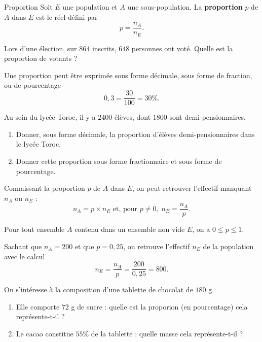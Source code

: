 \documentclass[11pt]{article}
\begin{document}
\begin{defi}{Proportion}
  Soit $E$ une population et $A$ une sous-population. La \textbf{proportion} $p$
  de $A$ dans $E$ est le réel défini par
      \[
        p = \frac{n_A}{n_E}.
      \]
\end{defi}
\begin{app}
  Lors d'une élection, sur $864$ inscrits, $648$ personnes ont voté. Quelle est
  la proportion de votants ?
\end{app}
\begin{rmq}
  Une proportion peut être exprimée sous forme décimale, sous forme de fraction,
  ou de pourcentage
  \[
    0,3 = \frac{30}{100} = 30\%.
  \]
\end{rmq}
\begin{app}
  Au sein du lycée Toroc, il y a $2400$ élèves, dont $1800$ sont
  demi-pensionnaires.
  \begin{enumerate}
    \item Donner, sous forme décimale, la proportion d'élèves demi-pensionnaires
      dans le lycée Toroc.
    \item Donner cette proportion sous forme fractionnaire et sous forme de
      pourcentage.
  \end{enumerate}
\end{app}

\begin{prop}
  Connaissant la proportion $p$ de $A$ dans $E$, on peut retrouver l'effectif
  manquant $n_A$ ou $n_E$ :
  \[
    n_A = p\times n_E\text{ et, pour }p\neq0,\;n_E=\frac{n_A}{p}.
  \]
\end{prop}
\begin{prop}
  Pour tout ensemble $A$ contenu dans un ensemble non vide $E$, on a $0\leq
  p\leq1$.
\end{prop}
\begin{exemple}
  Sachant que $n_A=200$ et que $p=0,25$, on retrouve l'effectif $n_E$ de la
  population avec le calcul
  \[
    n_E = \frac{n_A}{p} = \frac{200}{0,25}=800.
  \]
\end{exemple}
\begin{app}
  On s'intéresse à la composition d'une tablette de chocolat de $180$ g.
  \begin{enumerate}
    \item Elle comporte $72$ g de sucre : quelle est la proporion (en
      pourcentage) cela représente-t-il ?
    \item Le cacao constitue $55\%$ de la tablette : quelle masse cela
      représente-t-il ?
  \end{enumerate}
\end{app}
\end{document}

